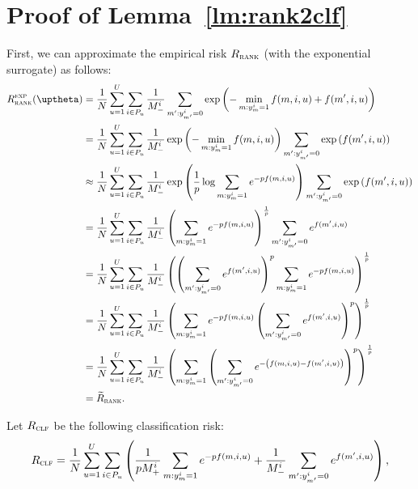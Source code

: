 \section{Proof of Lemma~\ref{lm:rank2clf}}

First, we can approximate the empirical risk $R_\textsc{rank}$ (with the exponential surrogate) as follows:
\begin{equation*}
\begin{aligned}
R_\textsc{rank}^\textsc{exp}(\uptheta)
&= \frac{1}{N} \sum_{u=1}^U \sum_{i \in P_u} \frac{1}{M_-^i} \sum_{m': y_{m'}^i = 0} \exp \left( -\min_{m: y_m^i = 1} f(m, i, u) + f(m', i, u) \right) \\
&= \frac{1}{N} \sum_{u=1}^U \sum_{i \in P_u} \frac{1}{M_-^i} \exp \left( -\min_{m: y_m^i = 1} f(m, i, u) \right) 
   \sum_{m': y_{m'}^i = 0} \exp \left( f(m', i, u) \right) \\
&\approx \frac{1}{N} \sum_{u=1}^U \sum_{i \in P_u} \frac{1}{M_-^i} \exp \left( \frac{1}{p} \log \sum_{m: y_m^i = 1} e^{-p f(m, i, u)} \right)
   \sum_{m': y_{m'}^i = 0} \exp \left( f(m', i, u) \right) \\
&= \frac{1}{N} \sum_{u=1}^U \sum_{i \in P_u} \frac{1}{M_-^i} \left( \sum_{m: y_m^i = 1} e^{-p f(m, i, u)} \right)^\frac{1}{p} 
   \sum_{m': y_{m'}^i = 0} e^{f(m', i, u)} \\
&= \frac{1}{N} \sum_{u=1}^U \sum_{i \in P_u} \frac{1}{M_-^i} \left( \left( \sum_{m': y_{m'}^i = 0} e^{f(m', i, u)} \right)^p 
   \sum_{m: y_m^i = 1} e^{-p f(m, i, u)} \right)^\frac{1}{p} \\
&= \frac{1}{N} \sum_{u=1}^U \sum_{i \in P_u} \frac{1}{M_-^i} \left( 
   \sum_{m: y_m^i = 1} e^{-p f(m, i, u)} \left( \sum_{m': y_{m'}^i = 0} e^{f(m', i, u)} \right)^p \right)^\frac{1}{p} \\
&= \frac{1}{N} \sum_{u=1}^U \sum_{i \in P_u} \frac{1}{M_-^i} \left( 
   \sum_{m: y_m^i = 1} \left( \sum_{m': y_{m'}^i = 0} e^{- \left( f(m, i, u) - f(m', i, u) \right)} \right)^p \right)^\frac{1}{p} \\
&= \widetilde R_\textsc{rank}.
\end{aligned}
\end{equation*}

Let $R_\textsc{clf}$ be the following classification risk:
\begin{equation*}
R_\textsc{clf} 
= \frac{1}{N} \sum_{u=1}^U \sum_{i \in P_u} \left( 
  \frac{1}{p M_+^i} \sum_{m: y_m^i = 1} e^{-p f(m, i, u)} 
  + \frac{1}{M_-^i} \sum_{m': y_{m'}^i = 0} e^{f(m', i, u)} \right),
\end{equation*}

